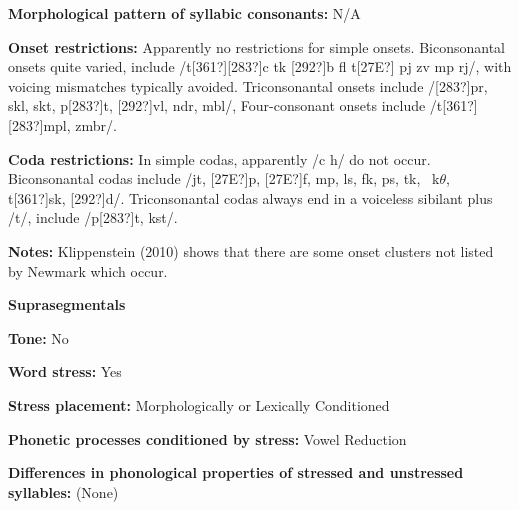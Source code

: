 \begin{styleBody}
\textbf{Morphological pattern of syllabic consonants:} N/A
\end{styleBody}

\begin{styleBody}
\textbf{Onset restrictions:} Apparently no restrictions for simple onsets. Biconsonantal onsets quite varied, include /t[361?][283?]c tk [292?]b fl t[27E?] pj zv mp rj/, with voicing mismatches typically avoided. Triconsonantal onsets include /[283?]pr, skl, skt, p[283?]t, [292?]vl, ndr, mbl/, Four-consonant onsets include /t[361?][283?]mpl, zmbr/.
\end{styleBody}

\begin{styleBody}
\textbf{Coda restrictions:} In simple codas, apparently /c h/ do not occur. Biconsonantal codas include /jt, [27E?]p, [27E?]f, mp, ls, fk, ps, tk, \ k$\theta $, t[361?]sk, [292?]d/. Triconsonantal codas always end in a voiceless sibilant plus /t/, include /p[283?]t, kst/.
\end{styleBody}

\begin{styleBody}
\textbf{Notes:} Klippenstein (2010) shows that there are some onset clusters not listed by Newmark which occur.
\end{styleBody}

\begin{styleBody}
\textbf{Suprasegmentals}
\end{styleBody}

\begin{styleBody}
\textbf{Tone:} No
\end{styleBody}

\begin{styleBody}
\textbf{Word stress: }Yes
\end{styleBody}

\begin{styleBody}
\textbf{Stress placement:} Morphologically or Lexically Conditioned
\end{styleBody}

\begin{styleBody}
\textbf{Phonetic processes conditioned by stress:} Vowel Reduction
\end{styleBody}

\begin{styleBody}
\textbf{Differences in phonological properties of stressed and unstressed syllables:} (None)
\end{styleBody}

